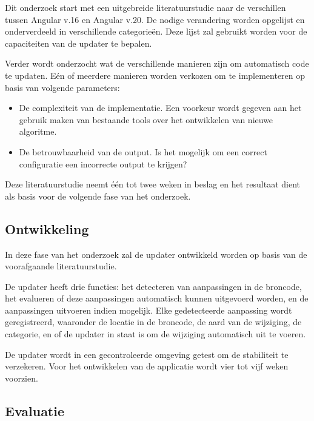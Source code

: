 Dit onderzoek start met een uitgebreide literatuurstudie naar de verschillen tussen Angular v.16 en Angular v.20.
De nodige verandering worden opgelijst en onderverdeeld in verschillende categorieën.
Deze lijst zal gebruikt worden voor de capaciteiten van de updater te bepalen.

Verder wordt onderzocht wat de verschillende manieren zijn om automatisch code te updaten.
Eén of meerdere manieren worden verkozen om te implementeren op basis van volgende parameters:
\begin{itemize}
  \item De complexiteit van de implementatie. Een voorkeur wordt gegeven aan het gebruik maken van bestaande tools over het ontwikkelen van nieuwe algoritme.
  \item De betrouwbaarheid van de output. Is het mogelijk om een correct configuratie een incorrecte output te krijgen?
\end{itemize}

Deze literatuurstudie neemt één tot twee weken in beslag en het resultaat dient als basis voor de volgende fase van het onderzoek.

\subsection{Ontwikkeling}

In deze fase van het onderzoek zal de updater ontwikkeld worden op basis van de voorafgaande literatuurstudie.

De updater heeft drie functies: het detecteren van aanpassingen in de broncode, het evalueren of deze aanpassingen automatisch kunnen uitgevoerd worden, en de aanpassingen uitvoeren indien mogelijk.
Elke gedetecteerde aanpassing wordt geregistreerd, waaronder de locatie in de broncode, de aard van de wijziging, de categorie, en of de updater in staat is om de wijziging automatisch uit te voeren.

De updater wordt in een gecontroleerde omgeving getest om de stabiliteit te verzekeren.
Voor het ontwikkelen van de applicatie wordt vier tot vijf weken voorzien.

\subsection{Evaluatie}

